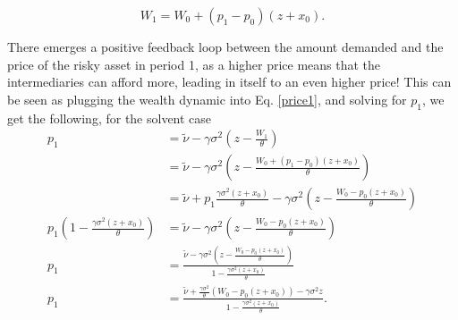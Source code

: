 \documentclass[11pt]{article}
\begin{document}
\begin{appendices}
\begin{equation}
W_1 = W_0 + (p_1-p_0)(z+x_0).
\end{equation}

There emerges a positive feedback loop between the amount demanded and the price of the risky asset in period 1, as a higher price means that the intermediaries can afford more, leading in itself to an even higher price! This can be seen as plugging the wealth dynamic into Eq. \ref{price1}, and solving for $p_1$, we get the following, for the solvent case 
\begin{equation}
\begin{split}
p_1 &= \tilde{\nu} - \gamma \sigma^2(z - \frac{W_1}{\theta})\\
    &= \tilde{\nu} - \gamma \sigma^2(z - \frac{W_0+ (p_1-p_0)(z+x_0)}{\theta})\\
    &= \tilde{\nu} + p_1\frac{\gamma\sigma^2(z+x_0)}{\theta} - \gamma \sigma^2(z - \frac{W_0 - p_0(z+x_0)}{\theta})\\
p_1(1 - \frac{\gamma\sigma^2(z+x_0)}{\theta})    &= \tilde{\nu} - \gamma \sigma^2(z - \frac{W_0 - p_0(z+x_0)}{\theta})\\
p_1   &= \frac{\tilde{\nu} - \gamma \sigma^2(z - \frac{W_0 - p_0(z+x_0)}{\theta})}{1 - \frac{\gamma\sigma^2(z+x_0)}{\theta}}\\
p_1   &= \frac{\tilde{\nu} + \frac{\gamma \sigma^2}{\theta}(W_0 - p_0(z+x_0)) - \gamma \sigma^2z}{1 - \frac{\gamma\sigma^2(z+x_0)}{\theta}}.\\
\end{split}
\end{equation}


\end{appendices}
\end{document}
